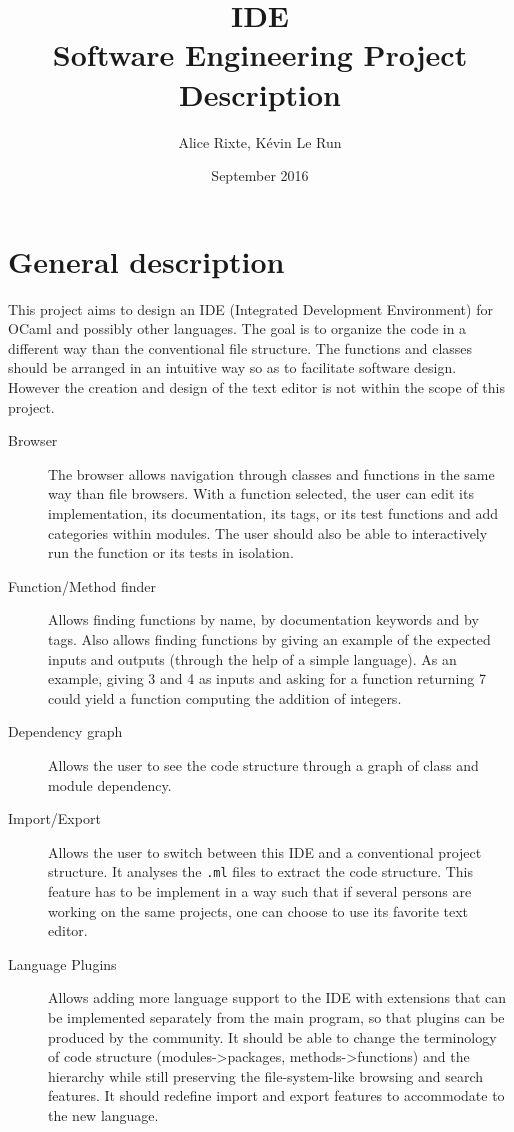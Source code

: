 \documentclass{article}
\title{IDE\\\Large{Software Engineering Project Description}}
\author{Alice Rixte, K\'evin Le Run}
\date{September 2016}
\begin{document}
\maketitle

\section{General description}

This project aims to design an IDE (Integrated Development Environment) for
OCaml and possibly other languages. The goal is to organize the code in a
different way than the conventional file structure. The functions and classes
should be arranged in an intuitive way so as to facilitate software design.
However the creation and design of the text editor is not within the scope of
this project.


\begin{description}

    \item [Browser] The browser allows navigation through classes and functions
        in the same way than file browsers. With a function selected, the user
        can edit its implementation, its documentation, its tags, or its test
        functions and add categories within modules.  The user should also be
        able to interactively run the function or its tests in isolation.

    \item [Function/Method finder] Allows finding functions by name, by
        documentation keywords and by tags. Also allows finding functions by
        giving an example of the expected inputs and outputs (through the help
        of a simple language). As an example, giving 3 and 4 as inputs and
        asking for a function returning 7 could yield a function computing the
        addition of integers.

    \item [Dependency graph] Allows the user to see the code structure through
        a graph of class and module dependency.

    \item [Import/Export] Allows the user to switch between this IDE and a
        conventional project structure. It analyses the \texttt{.ml} files to
        extract the code structure. This feature has to be implement in a 
        way such that if several persons are working on the same projects,
        one can choose to use its favorite text editor.

    \item [Language Plugins] Allows adding more language support to the IDE
        with extensions that can be implemented separately from the main
        program, so that plugins can be produced by the community. It should be
        able to change the terminology of code structure (modules->packages,
        methods->functions) and the hierarchy while still preserving the
        file-system-like browsing and search features. It should redefine
        import and export features to accommodate to the new language.

\end{description}
\end{document}
